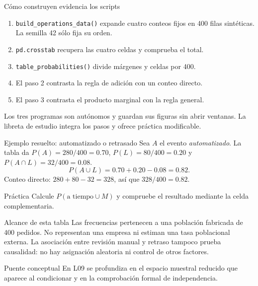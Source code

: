 \documentclass[aspectratio=169,10pt,spanish]{beamer}
\begin{document}
\begin{frame}{Cómo construyen evidencia los scripts}
  \small
  \begin{enumerate}
    \item \texttt{build\_operations\_data()} expande cuatro conteos fijos en
      400 filas sintéticas. La semilla 42 sólo fija su orden.
    \item \texttt{pd.crosstab} recupera las cuatro celdas y comprueba el total.
    \item \texttt{table\_probabilities()} divide márgenes y celdas por 400.
    \item El paso 2 contrasta la regla de adición con un conteo directo.
    \item El paso 3 contrasta el producto marginal con la regla general.
  \end{enumerate}
  Los tres programas son autónomos y guardan sus figuras sin abrir ventanas.
  La libreta de estudio integra los pasos y ofrece práctica modificable.
\end{frame}

\begin{frame}{Ejemplo resuelto: automatizado o retrasado}
  \small
  Sea \(A\) el evento \emph{automatizado}. La tabla da
  \(P(A)=280/400=0.70\), \(P(L)=80/400=0.20\) y
  \(P(A\cap L)=32/400=0.08\).
  \[
    P(A\cup L)=0.70+0.20-0.08=0.82.
  \]
  Conteo directo: \(280+80-32=328\), así que \(328/400=0.82\).
  \begin{block}{Práctica}
    Calcule \(P(\text{a tiempo}\cup M)\) y compruebe el resultado
    mediante la celda complementaria.
  \end{block}
\end{frame}

\begin{frame}{Alcance de esta tabla}
  \small
  Las frecuencias pertenecen a una población fabricada de 400 pedidos.
  No representan una empresa ni estiman una tasa poblacional externa.
  La asociación entre revisión manual y retraso tampoco prueba causalidad:
  no hay asignación aleatoria ni control de otros factores.

  \begin{block}{Puente conceptual}
    En L09 se profundiza en el espacio muestral reducido que aparece al
    condicionar y en la comprobación formal de independencia.
  \end{block}
\end{frame}
\end{document}

